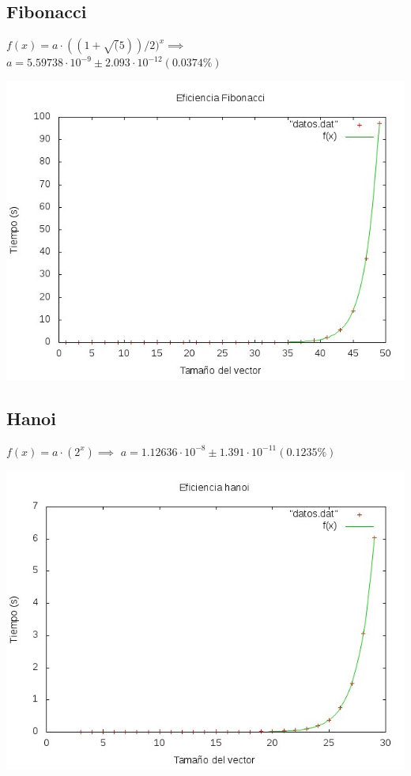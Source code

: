 \documentclass[11pt,spanish]{article} %
\begin{document}
\subsection{Fibonacci}
$ f(x) = a\cdot ((1+\sqrt(5))/2)^x \implies$
$a               = 5.59738\cdot 10^{-9}      \pm 2.093\cdot 10^{-12}    (0.0374\%)$

\begin{center}
\includegraphics[scale=0.55]{../Graficas/Fibonacci/fibonacciO0_ruben.jpeg}
\end{center}
\newpage
\subsection{Hanoi}
$f(x) = a\cdot(2^x) \implies$
$a               = 1.12636\cdot 10^{-8}      \pm 1.391\cdot 10^{-11}    (0.1235\%)$
\begin{center}
\includegraphics[scale=0.55]{../Graficas/Hanoi/hanoiO0_ruben.jpeg}
\end{center}
\end{document}
